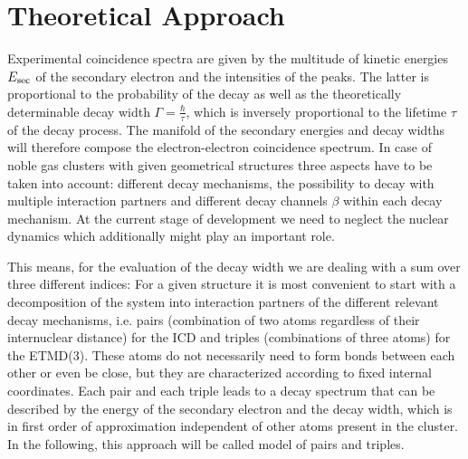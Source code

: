 \section{Theoretical Approach}
%
Experimental coincidence spectra are given by the multitude of
kinetic energies $E_{\rm sec}$ of the secondary electron
and the intensities of the peaks. The latter is proportional to the
probability of the decay as well as the theoretically determinable
decay width $\Gamma=\frac{\hbar}{\tau}$,
which is inversely proportional to the lifetime $\tau$ of the decay process.
The manifold of the
secondary energies and decay widths will therefore compose the electron-electron
coincidence spectrum.
In case of noble gas clusters
with given geometrical structures three aspects have to be taken into account:
different decay mechanisms, the possibility to decay with multiple
interaction partners and different decay channels $\beta$ within
each decay mechanism.
At the current stage of development we need to neglect the nuclear dynamics which
additionally might play an important role.


This means, for the evaluation of the decay width we are dealing with a sum over three different indices: 
For a given structure it is most convenient to
start with a decomposition of the system into interaction partners of
the different relevant decay mechanisms, i.e. pairs (combination of two atoms regardless
of their internuclear distance) for the ICD and triples (combinations of three atoms)
for the ETMD(3).
These atoms do not necessarily need to form bonds between each other or
even be close, but they are characterized according to fixed internal
coordinates. 
Each pair and each triple leads to a decay spectrum that can be described by the energy of the secondary electron and the decay width, which is in first order of approximation independent of other atoms present in the cluster.
In the following, this approach will be called model of pairs and triples.


